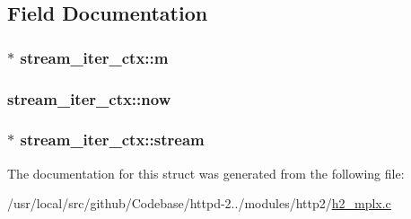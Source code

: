 \subsection{Field Documentation}
\subsubsection[{\texorpdfstring{m}{m}}]{$\ast$ stream\+\_\+iter\+\_\+ctx\+::m}\hypertarget{structstream__iter__ctx_a226d68aae95c6a147dab4b6a05360f07}{}\label{structstream__iter__ctx_a226d68aae95c6a147dab4b6a05360f07}
\subsubsection[{\texorpdfstring{now}{now}}]{ stream\+\_\+iter\+\_\+ctx\+::now}\hypertarget{structstream__iter__ctx_a11d13e9433e07c4fb11553fe60f22f5b}{}\label{structstream__iter__ctx_a11d13e9433e07c4fb11553fe60f22f5b}
\subsubsection[{\texorpdfstring{stream}{stream}}]{$\ast$ stream\+\_\+iter\+\_\+ctx\+::stream}\hypertarget{structstream__iter__ctx_a3c57e061b71c85e8d060fbe707a227ee}{}\label{structstream__iter__ctx_a3c57e061b71c85e8d060fbe707a227ee}


The documentation for this struct was generated from the following file\+:\begin{DoxyCompactItemize}
\item 
/usr/local/src/github/\+Codebase/httpd-\/2../modules/http2/\hyperlink{h2__mplx_8c}{h2\+\_\+mplx.\+c}\end{DoxyCompactItemize}
